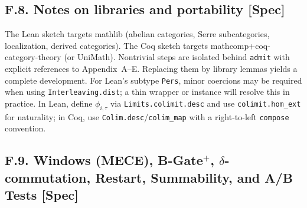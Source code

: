 \documentclass[11pt]{article}
\numberwithin{equation}{section}
\theoremstyle{definition}
\begin{document}
\subsection*{F.8. Notes on libraries and portability [Spec]}
The Lean sketch targets \textsf{mathlib} (abelian categories, Serre subcategories, localization, derived categories).
The Coq sketch targets \textsf{mathcomp}+\textsf{coq-category-theory} (or \textsf{UniMath}). Nontrivial steps are
isolated behind \texttt{admit} with explicit references to Appendix~A–E. Replacing them by library lemmas yields
a complete development. For Lean’s subtype \texttt{Pers}, minor coercions may be required when using
\texttt{Interleaving.dist}; a thin wrapper or instance will resolve this in practice.
In Lean, define \(\phi_{i,\tau}\) via \texttt{Limits.colimit.desc} and use \texttt{colimit.hom\_ext} for naturality;
in Coq, use \texttt{Colim.desc}/\texttt{colim\_map} with a right-to-left \texttt{compose} convention.

\subsection*{F.9. Windows (MECE), B-Gate\texorpdfstring{$^{+}$}{+}, $\delta$-commutation, Restart, Summability, and A/B Tests [Spec]}
\end{document}
